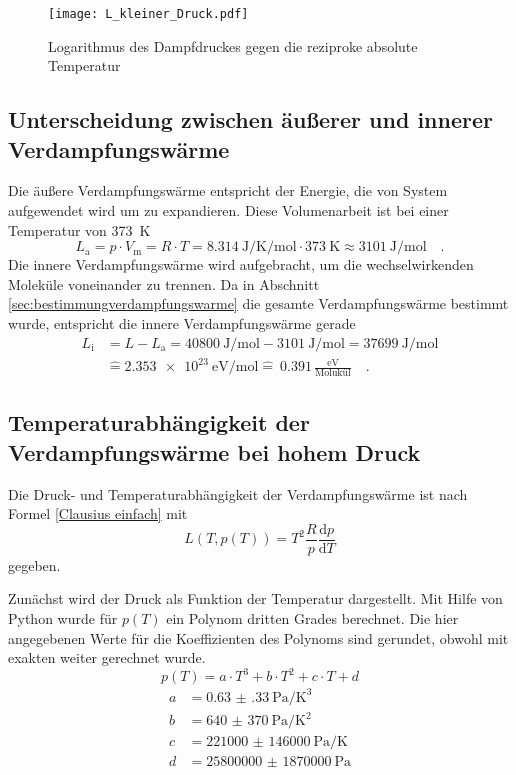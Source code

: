\begin{figure}[h!]
	\centering
	\texttt{[image: L\_kleiner\_Druck.pdf]}
	\caption{Logarithmus des Dampfdruckes gegen die reziproke absolute Temperatur}
	\label{fig:L_kleiner_Druck}
\end{figure}

\subsection{Unterscheidung zwischen äußerer und innerer Verdampfungswärme}
Die äußere Verdampfungswärme entspricht der Energie, die von System aufgewendet wird um zu expandieren. Diese Volumenarbeit ist bei einer Temperatur von  \SI{373}{\kelvin}
\begin{equation}
L_\text{a} = p \cdot V_\text{m} = R \cdot T = \SI{8.314}{\joule\per\kelvin\per\mol} \cdot  \SI{373}{\kelvin} \approx \SI{3101}{\joule\per\mol} \quad.
\end{equation}
Die innere Verdampfungswärme wird aufgebracht, um die wechselwirkenden Moleküle voneinander zu trennen. Da in Abschnitt \ref{sec:bestimmungverdampfungswarme} die gesamte Verdampfungswärme bestimmt wurde, entspricht die innere Verdampfungswärme gerade
\begin{align}
L_\text{i} &= L - L_{\text{a}} = \SI{40800}{\joule\per\mol} - \SI{3101}{\joule\per\mol} = \SI{37699}{\joule\per\mol} \\
&\widehat{=} \SI{2.353e23}{\eV\per\mol} \widehat{=} \ 0.391 \, \frac{\si{\eV}}{\text{Molukül}}\quad.
\end{align}





\subsection{Temperaturabhängigkeit der Verdampfungswärme bei hohem Druck}
Die Druck- und Temperaturabhängigkeit der Verdampfungswärme ist nach Formel \eqref{Clausius einfach} mit
\begin{equation}
	L(T, p(T)) = T^2\frac{R}{p}\frac{\text{d}p}{\text{d}T}
\end{equation} gegeben.

Zunächst wird der Druck als Funktion der Temperatur dargestellt. Mit Hilfe von Python wurde für $p(T)$ ein Polynom dritten Grades berechnet. Die hier angegebenen Werte für die Koeffizienten des Polynoms sind gerundet, obwohl mit exakten weiter gerechnet wurde.
\begin{equation}
p(T) = a \cdot T ^3 + b \cdot T^2 +c \cdot T + d
\end{equation}
\begin{align}
a &=\SI{0.63(33)}{\pascal\per\kelvin\cubed}  \\
b &= \SI[per-mode = fraction]{640(370)}{\pascal\per\kelvin\squared}  \\
c &= \SI{221000(146000)}{\pascal\per\kelvin} \\
d  &= \SI{25800000(1870000)}{\pascal}
\end{align}


